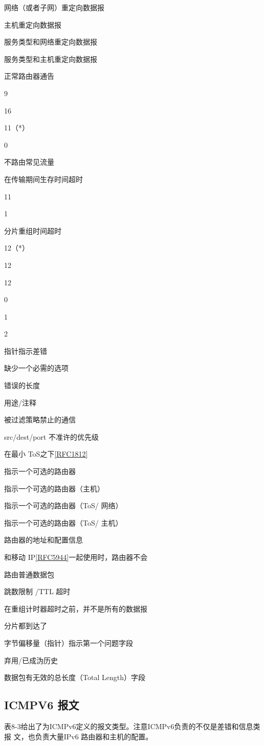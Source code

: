 网络（或者子网）重定向数据报

主机重定向数据报

服务类型和网络重定向数据报

服务类型和主机重定向数据报

正常路由器通告

9

16

11（*）

0

不路由常见流量

在传输期间生存时间超时

11

1

分片重组时间超时

12（*）

12

12

0

1

2

指针指示差错

缺少一个必需的选项

错误的长度

用途/注释

被过滤策略禁止的通信

src/dest/port 不准许的优先级

在最小 ToS之下\href{https://www.rfc-editor.org/rfc/rfc1812}{[RFC1812]}

指示一个可选的路由器

指示一个可选的路由器（主机）

指示一个可选的路由器（ToS/ 网络）

指示一个可选的路由器（ToS/ 主机）

路由器的地址和配置信息

和移动 IP\href{https://www.rfc-editor.org/rfc/rfc5944}{[RFC5944]}一起使用时，路由器不会

路由普通数据包

跳数限制 /TTL 超时

在重组计时器超时之前，并不是所有的数据报

分片都到达了

字节偏移量（指针）指示第一个问题字段

弃用/已成沩历史

数据包有无效的总长度（Total Length）字段

\subsection{ICMPV6 报文}
表8-3给出了为ICMPv6定义的报文类型。注意ICMPv6负责的不仅是差错和信息类报
文，也负责大量IPv6 路由器和主机的配置。

